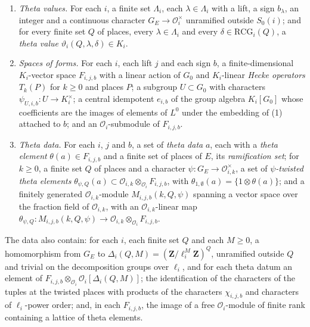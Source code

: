 \begin{definition}
\begin{enumerate}
  $\chi_{i,j,b}\colon G_E\to(\mathcal O^0_i)^\times$ for $j\geq0$ and signs
  $b$ such that: $\chi_{i,j,b}$ is unramified at every place of $E$ that is not
  in $P_D(i)$ and lies over none of $\ell_i$, $g_0$ and $g_1$; on the inertia
  groups at the places of $P_D(i)$ it equals $\delta_i$ or $\delta_i^{-1}$,
  according to $b$; and $\chi_{i,j,b}(\sigma)^{g_k-1}=1$ for $\sigma$ in an
  inertia group at a place over $g_k$ not over $\ell_i$. A finite set of
  \emph{signatures} $s$, each with a
  lift $1\leq j_s\leq m$, a sign $b_s$, a continuous representation
  $\rho_s\colon G_E\to GL_r(\mathcal O^0_i)$ and \emph{Hecke eigenvalues}
  $\lambda_s(k,P)\in\mathcal O_i$ for $k\geq1$ and places $P$ of $E$. Put
  $\chi_s=\chi_{i,j_s,b_s}$.
\item \emph{Theta values.} For each $i$, a finite set $\Lambda_i$, each
  $\lambda\in\Lambda_i$ with a lift, a sign $b_\lambda$, an integer and a
  continuous character $G_E\to\mathcal O_i^\times$ unramified outside $S_0(i)$;
  and for every finite set $Q$ of places, every $\lambda\in\Lambda_i$ and every
  $\delta\in\mathrm{RCG}_i(Q)$, a \emph{theta value}
  $\vartheta_i(Q,\lambda,\delta)\in K_i$.
\item \emph{Spaces of forms.} For each $i$, each lift $j$ and each sign $b$, a
  finite-dimensional $K_i$-vector space $F_{i,j,b}$ with a linear action of
  $G_0$ and $K_i$-linear \emph{Hecke operators} $T_k(P)$ for $k\geq0$ and places
  $P$; a subgroup $U\subset G_0$ with characters
  $\psi_{U,i,b}\colon U\to K_i^\times$; a central idempotent $e_{i,b}$ of the
  group algebra $K_i[G_0]$ whose coefficients are the images of elements of
  $L^0$ under the embedding of (1) attached to $b$; and an
  $\mathcal O_i$-submodule of $F_{i,j,b}$.
\item \emph{Theta data.} For each $i$, $j$ and $b$, a set of \emph{theta data}
  $a$, each with a \emph{theta element} $\theta(a)\in F_{i,j,b}$ and a finite
  set of places of $E$, its \emph{ramification set}; for $k\geq0$, a finite set $Q$ of
  places and a character $\psi\colon G_E\to\mathcal O_{i,k}^\times$, a set of
  \emph{$\psi$-twisted theta elements}
  $\theta_{\psi,Q}(a)\subset\mathcal O_{i,k}\otimes_{\mathcal O_i}F_{i,j,b}$,
  with $\theta_{1,\emptyset}(a)=\{1\otimes\theta(a)\}$; and a finitely generated
  $\mathcal O_{i,k}$-module $M_{i,j,b}(k,Q,\psi)$ spanning a vector space over
  the fraction field of $\mathcal O_{i,k}$, with an $\mathcal O_{i,k}$-linear map
  $\theta_{\psi,Q}\colon M_{i,j,b}(k,Q,\psi)\to\mathcal O_{i,k}\otimes_{\mathcal O_i}F_{i,j,b}$.
\end{enumerate}
The data also contain: for each $i$, each finite set $Q$ and each $M\geq0$, a
homomorphism from $G_E$ to $\Delta_i(Q,M)=(\mathbf Z/\ell_i^M\mathbf Z)^Q$,
unramified outside $Q$ and trivial on the decomposition groups over $\ell_i$,
and for each theta datum an element of
$F_{i,j,b}\otimes_{\mathcal O_i}\mathcal O_i[\Delta_i(Q,M)]$; the
identification of the characters of the tuples at the twisted places with
products of the characters $\chi_{i,j,b}$ and characters of $\ell_i$-power
order; and, in each $F_{i,j,b}$, the image of a free $\mathcal O_i$-module of
finite rank containing a lattice of theta elements.


\end{definition}
